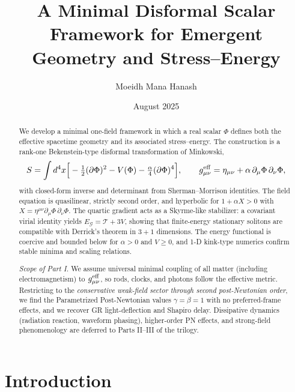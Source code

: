\documentclass{article}
\title{A Minimal Disformal Scalar Framework for Emergent Geometry and Stress–Energy}
\author{Moeidh Mana Hanash}
\date{August 2025}
\begin{document}
\maketitle
\begin{abstract}
We develop a minimal one-field framework in which a real scalar $\Phi$ defines both the effective spacetime geometry and its associated stress–energy. The construction is a rank-one Bekenstein-type disformal transformation of Minkowski,
\begin{equation}
S=\int d^4x\Big[-\tfrac{1}{2}(\partial\Phi)^2 - V(\Phi) - \tfrac{\alpha}{4}(\partial\Phi)^4\Big],
\qquad
g^{\rm eff}_{\mu\nu}=\eta_{\mu\nu}+\alpha\,\partial_\mu\Phi\,\partial_\nu\Phi, \label{1}
\end{equation}
with closed-form inverse and determinant from Sherman–Morrison identities. The field equation is quasilinear, strictly second order, and hyperbolic for $1+\alpha X>0$ with $X=\eta^{\mu\nu}\partial_\mu\Phi\,\partial_\nu\Phi$. The quartic gradient acts as a Skyrme-like stabilizer: a covariant virial identity yields $E_{\mathcal G}=\mathcal T+3V$, showing that finite-energy stationary solitons are compatible with Derrick’s theorem in $3{+}1$ dimensions. The energy functional is coercive and bounded below for $\alpha>0$ and $V\!\ge\!0$, and 1-D kink-type numerics confirm stable minima and scaling relations.

\emph{Scope of Part I.} We assume universal minimal coupling of all matter (including electromagnetism) to $g^{\rm eff}_{\mu\nu}$, so rods, clocks, and photons follow the effective metric. Restricting to the \emph{conservative weak-field sector through second post-Newtonian order}, we find the Parametrized Post-Newtonian values $\gamma=\beta=1$ with no preferred-frame effects, and we recover GR light-deflection and Shapiro delay. Dissipative dynamics (radiation reaction, waveform phasing), higher-order PN effects, and strong-field phenomenology are deferred to Parts II–III of the trilogy.
\end{abstract}

\section{Introduction}
\end{document}
